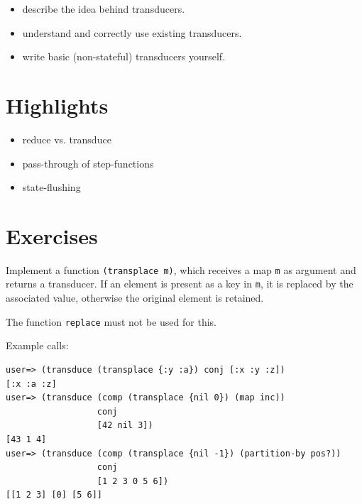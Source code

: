 \documentclass[11pt,a4paper]{article}
\begin{document}
\begin{itemize}
    \item describe the idea behind transducers.
    \item understand and correctly use existing transducers.
    \item write basic (non-stateful) transducers yourself.
\end{itemize}

\section{Highlights}

\begin{itemize}
    \item reduce vs. transduce
    \item pass-through of step-functions
    \item state-flushing
\end{itemize}



\section{Exercises}

\begin{exercise}[Transducer]

Implement a function \verb|(transplace m)|,
which receives a map \verb|m| as argument and returns a transducer.
If an element is present as a key in \verb|m|,
it is replaced by the associated value,
otherwise the original element is retained.

The function \texttt{replace} must not be used for this.

\vspace{8px}
Example calls:
\begin{verbatim}
user=> (transduce (transplace {:y :a}) conj [:x :y :z])
[:x :a :z]
user=> (transduce (comp (transplace {nil 0}) (map inc))
                  conj
                  [42 nil 3])
[43 1 4]
user=> (transduce (comp (transplace {nil -1}) (partition-by pos?)) 
                  conj
                  [1 2 3 0 5 6])
[[1 2 3] [0] [5 6]]
\end{verbatim} 
\end{exercise} 
\end{document}
